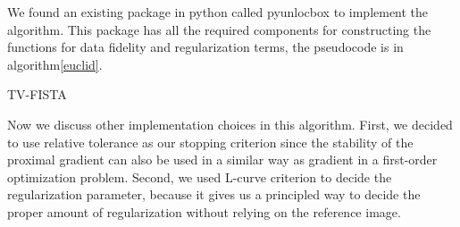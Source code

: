 \documentclass[12pt]{article}
\makeatletter
\newcommand{\noin}{\noindent}
\def\BState{\State\hskip-\ALG@thistlm}
\makeatother
\begin{document}
\vspace{0.2in}
\noin We found an existing package in python called pyunlocbox \cite{pyunlocbox} to implement the algorithm. This package has all the required components for constructing the functions for data fidelity and regularization terms, the pseudocode is in algorithm\ref{euclid}.

\begin{algorithm}
\caption{TV-FISTA}\label{euclid}
\end{algorithm}

\vspace{0.2in}

\noin Now we discuss other implementation choices in this algorithm. First, we decided to use relative tolerance as our stopping criterion since the stability of the proximal gradient can also be used in a similar way as gradient in a first-order optimization problem. Second, we used L-curve criterion to decide the regularization parameter, because it gives us a principled way to decide the proper amount of regularization without relying on the reference image. 

%
\end{document}
